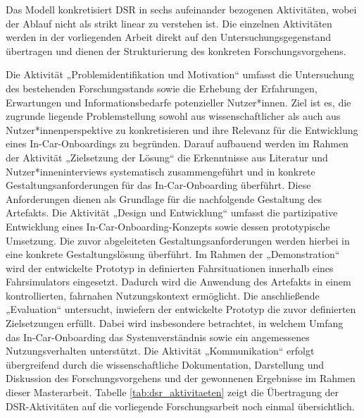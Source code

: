 Das Modell konkretisiert DSR in sechs aufeinander bezogenen Aktivitäten, wobei der Ablauf nicht als strikt linear zu verstehen ist. Die einzelnen Aktivitäten werden in der vorliegenden Arbeit direkt auf den Untersuchungsgegenstand übertragen und dienen der Strukturierung des konkreten Forschungsvorgehens.

Die Aktivität „Problemidentifikation und Motivation“ umfasst die Untersuchung des bestehenden Forschungsstands sowie die Erhebung der Erfahrungen, Erwartungen und Informationsbedarfe potenzieller Nutzer*innen. Ziel ist es, die zugrunde liegende Problemstellung sowohl aus wissenschaftlicher als auch aus Nutzer*innenperspektive zu konkretisieren und ihre Relevanz für die Entwicklung eines In-Car-Onboardings zu begründen. Darauf aufbauend werden im Rahmen der Aktivität „Zielsetzung der Lösung“ die Erkenntnisse aus Literatur und Nutzer*inneninterviews systematisch zusammengeführt und in konkrete Gestaltungsanforderungen für das In-Car-Onboarding überführt. Diese Anforderungen dienen als Grundlage für die nachfolgende Gestaltung des Artefakts. Die Aktivität „Design und Entwicklung“ umfasst die partizipative Entwicklung eines In-Car-Onboarding-Konzepts sowie dessen prototypische Umsetzung. Die zuvor abgeleiteten Gestaltungsanforderungen werden hierbei in eine konkrete Gestaltungslösung überführt. Im Rahmen der „Demonstration“ wird der entwickelte Prototyp in definierten Fahrsituationen innerhalb eines Fahrsimulators eingesetzt. Dadurch wird die Anwendung des Artefakts in einem kontrollierten, fahrnahen Nutzungskontext ermöglicht. Die anschließende „Evaluation“ untersucht, inwiefern der entwickelte Prototyp die zuvor definierten Zielsetzungen erfüllt. Dabei wird insbesondere betrachtet, in welchem Umfang das In-Car-Onboarding das Systemverständnis sowie ein angemessenes Nutzungsverhalten unterstützt. Die Aktivität „Kommunikation“ erfolgt übergreifend durch die wissenschaftliche Dokumentation, Darstellung und Diskussion des Forschungsvorgehens und der gewonnenen Ergebnisse im Rahmen dieser Masterarbeit. Tabelle \ref{tab:dsr_aktivitaeten} zeigt die Übertragung der DSR-Aktivitäten auf die vorliegende Forschungsarbeit noch einmal übersichtlich.

